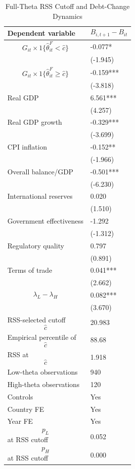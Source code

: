 \begin{table}[H]\centering
\begin{threeparttable}
\caption{Full-Theta RSS Cutoff and Debt-Change Dynamics}
\label{tab:deltaB_rss_cutoff_fulltheta}
\scriptsize
\begin{tabularx}{\textwidth}{lY}
\toprule
Dependent variable & $$B_{i,t+1}-B_{it}$$ \\
\midrule
$$G_{it}\times 1\{\widehat{\theta}^{F}_{it}<\widehat{c}\}$$ & -0.077* \\
 & (-1.945) \\
$$G_{it}\times 1\{\widehat{\theta}^{F}_{it}\geq\widehat{c}\}$$ & -0.159*** \\
 & (-3.818) \\
Real GDP & 6.561*** \\
 & (4.257) \\
Real GDP growth & -0.329*** \\
 & (-3.699) \\
CPI inflation & -0.152** \\
 & (-1.966) \\
Overall balance/GDP & -0.501*** \\
 & (-6.230) \\
International reserves & 0.020 \\
 & (1.510) \\
Government effectiveness & -1.292 \\
 & (-1.312) \\
Regulatory quality & 0.797 \\
 & (0.891) \\
Terms of trade & 0.041*** \\
 & (2.662) \\
$$\lambda_L-\lambda_H$$ & 0.082*** \\
 & (3.670) \\
\midrule
RSS-selected cutoff $$\widehat{c}$$ & 20.983 \\
Empirical percentile of $$\widehat{c}$$ & 88.68 \\
RSS at $$\widehat{c}$$ & 1.918 \\
Low-theta observations & 940 \\
High-theta observations & 120 \\
Controls & Yes \\
Country FE & Yes \\
Year FE & Yes \\
$$p_L$$ at RSS cutoff & 0.052 \\
$$p_H$$ at RSS cutoff & 0.000 \\

\end{tabularx}
\end{threeparttable}
\end{table}
